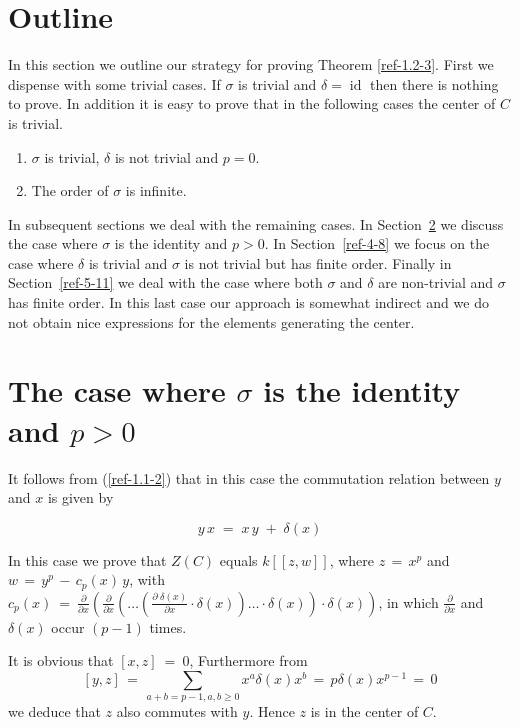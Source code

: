 \documentclass{amsart}
\numberwithin{equation}{section}
\def\Id{\operatorname{id}}
\theoremstyle{definition}
\theoremstyle{remark}
\begin{document}
\section{Outline}
In this section we outline our strategy for proving Theorem
\ref{ref-1.2-3}. First we dispense with some trivial cases. If $\sigma$
is trivial and $\delta=\Id$ then there is nothing to prove. 
In addition it is easy to prove that in the following cases the
center of $C$ is trivial.
\begin{enumerate}
\item $\sigma$ is trivial, $\delta$ is not trivial  and $p=0$.
\item The order of $\sigma$ is infinite.
\end{enumerate}
In subsequent sections we deal with the remaining cases.
 In Section~\ref{ref-3-5} we discuss the case where $\sigma$ is 
the identity and $p>0$.
In Section~\ref{ref-4-8} we focus on the case where $\delta$ 
is trivial and $\sigma$ is not trivial but has finite order. Finally in  Section~\ref{ref-5-11} 
 we deal with the case where both $\sigma$ and $\delta$ are
 non-trivial and $\sigma$ has finite order. In this last case our
 approach  is somewhat
 indirect  and we do not obtain nice expressions for the
 elements generating the center.


\section{The case where $\sigma$ is the identity and $p>0$}
\label{ref-3-5}

It follows  from (\ref{ref-1.1-2}) that in this case the commutation
relation between $y$ and $x$ is given by

\begin{equation} \label{ref-3.1-6}
    y\,x\;=\;x\,y\;+\;\delta(x)
\end{equation}

In this case we prove that $Z(C)$ equals $k[[z,w]]$, where
$z\,=\,x^{p}$ and \\ $w\,=\,y^{p}\,-\,c_{p}(x)\,y$, with
$\displaystyle{c_{p}(x)\:=\:\frac{\partial}{\partial x}
\left( \frac{\partial}{\partial x} \left( \ldots \left(
\frac{\partial \; \delta(x)}{\partial x} \cdot \delta(x) \right)
\ldots \cdot \delta(x) \right) \cdot \delta(x) \right)}$, in which 
 $\displaystyle{\frac{\partial}{\partial x}}$ and
$\delta(x)$ occur  $(p-1)$ times.

It is obvious that $[x,z]\:=\:0$, Furthermore from
\[
[y,z] \,=\, \displaystyle{\sum_{a+b=p-1,a,b \geq 0}x^{a} \delta(x) x^{b}}
\,=\, p \delta(x) x^{p-1} \,=\, 0
\]
we deduce that $z$ also commutes with $y$. Hence $z$ is in the center
of $C$.
\end{document}
